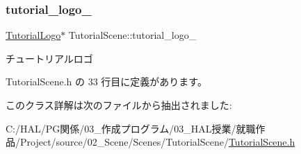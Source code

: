 \subsubsection{\texorpdfstring{tutorial\+\_\+logo\+\_\+}{tutorial\_logo\_}}
{\footnotesize\ttfamily \mbox{\hyperlink{class_tutorial_logo}{Tutorial\+Logo}}$\ast$ Tutorial\+Scene\+::tutorial\+\_\+logo\+\_\+\hspace{0.3cm}{\ttfamily [private]}}



チュートリアルロゴ 



 Tutorial\+Scene.\+h の 33 行目に定義があります。



このクラス詳解は次のファイルから抽出されました\+:\begin{DoxyCompactItemize}
\item 
C\+:/\+H\+A\+L/\+P\+G関係/03\+\_\+作成プログラム/03\+\_\+\+H\+A\+L授業/就職作品/\+Project/source/02\+\_\+\+Scene/\+Scenes/\+Tutorial\+Scene/\mbox{\hyperlink{_tutorial_scene_8h}{Tutorial\+Scene.\+h}}\end{DoxyCompactItemize}

